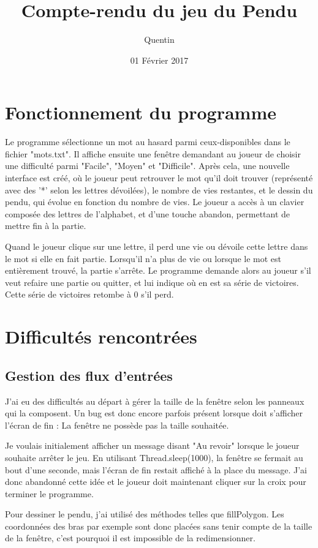 \documentclass{report}
\title{Compte-rendu du jeu du Pendu}
\author{Quentin \bsc{SAUVAGE}}
\date{01 Février 2017}
\begin{document}
\maketitle
\chapter{Fonctionnement du programme}
Le programme sélectionne un mot au hasard parmi ceux-disponibles dans le fichier "mots.txt". Il affiche ensuite une fenêtre demandant au joueur de choisir une difficulté parmi "Facile", "Moyen" et "Difficile". Après cela, une nouvelle interface est créé, où le joueur peut retrouver le mot qu'il doit trouver (représenté avec des '*' selon les lettres dévoilées), le nombre de vies restantes, et le dessin du pendu, qui évolue en fonction du nombre de vies. Le joueur a accès à un clavier composée des lettres de l'alphabet, et d'une touche abandon, permettant de mettre fin à la partie.

Quand le joueur clique sur une lettre, il perd une vie ou dévoile cette lettre dans le mot si elle en fait partie. Lorsqu'il n'a plus de vie ou lorsque le mot est entièrement trouvé, la partie s'arrête. Le programme demande alors au joueur s'il veut refaire une partie ou quitter, et lui indique où en est sa série de victoires. Cette série de victoires retombe à 0 s'il perd.
\chapter{Difficultés rencontrées}
\section{Gestion des flux d'entrées}
J'ai eu des difficultés au départ à gérer la taille de la fenêtre selon les panneaux qui la composent. Un bug est donc encore parfois présent lorsque doit s'afficher l'écran de fin : La fenêtre ne possède pas la taille souhaitée.

Je voulais initialement afficher un message disant "Au revoir" lorsque le joueur souhaite arrêter le jeu. En utilisant Thread.sleep(1000), la fenêtre se fermait au bout d'une seconde, mais l'écran de fin restait affiché à la place du message. J'ai donc abandonné cette idée et le joueur doit maintenant cliquer sur la croix pour terminer le programme.

Pour dessiner le pendu, j'ai utilisé des méthodes telles que fillPolygon. Les coordonnées des bras par exemple sont donc placées sans tenir compte de la taille de la fenêtre, c'est pourquoi il est impossible de la redimensionner.
\end{document}
